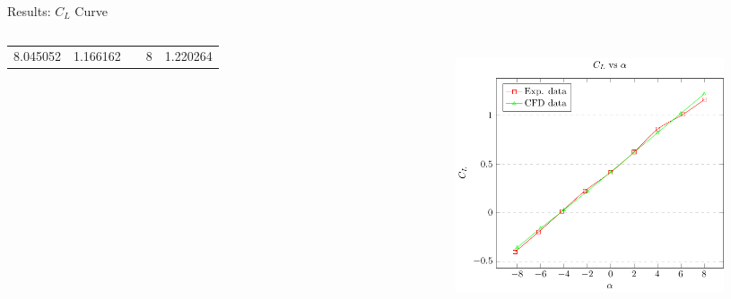\documentclass[english,10pt,a4paper,twoside]{beamer}
\begin{document}
\begin{frame}[shrink = 65]{Results: $C_L$ Curve}
\begin{columns}[T]
\begin{table}[H]
\begin{tabular}{|ccccc|}
				\multicolumn{1}{|c|}{8.045052} & \multicolumn{1}{c|}{1.166162} & \multicolumn{1}{c|}{} & \multicolumn{1}{c|}{8}        & 1.220264 \\ \cline{1-2} \cline{4-5} 
			\end{tabular}
		\end{table}
		\begin{figure}[H]
			\centering
			\includegraphics[width=0.8\linewidth]{figures/linear_zone}
			\label{fig:linearzone}
		\end{figure}
		
\rule{.1mm}{2.5\textheight}


\end{columns}
\end{frame}
\end{document}
